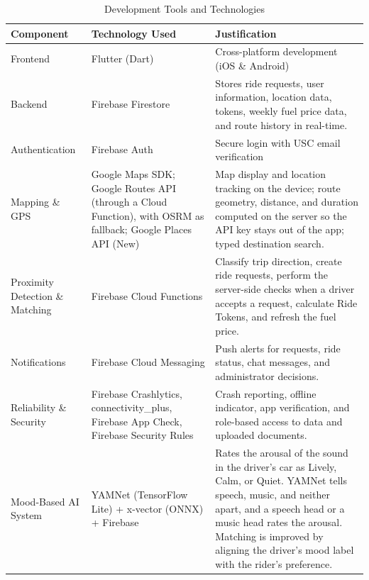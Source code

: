 \begin{table}[htbp]
    \centering
    \caption{Development Tools and Technologies}
    \small
    \renewcommand{\arraystretch}{1.2}

    \begin{tabular}{|>{\raggedright\arraybackslash}p{}|>{\raggedright\arraybackslash}p{}|>{\raggedright\arraybackslash}p{}|}
        \hline
        \textbf{Component} & \textbf{Technology Used} & \textbf{Justification} \\ 
        \hline
        Frontend & Flutter (Dart) & Cross-platform development (iOS \& Android) \\ 
        
        Backend & Firebase Firestore & Stores ride requests, user information, location data, tokens, weekly fuel price data, and route history in real-time. \\ 

        Authentication & Firebase Auth & Secure login with USC email verification \\ 
        
        Mapping \& GPS & Google Maps SDK; Google Routes API (through a Cloud Function), with OSRM as fallback; Google Places API (New) & Map display and location tracking on the device; route geometry, distance, and duration computed on the server so the API key stays out of the app; typed destination search. \\ 
        
        Proximity Detection \& Matching & Firebase Cloud Functions & Classify trip direction, create ride requests, perform the server-side checks when a driver accepts a request, calculate Ride Tokens, and refresh the fuel price. \\ 

        Notifications & Firebase Cloud Messaging & Push alerts for requests, ride status, chat messages, and administrator decisions. \\ 

        Reliability \& Security & Firebase Crashlytics, connectivity\_plus, Firebase App Check, Firebase Security Rules & Crash reporting, offline indicator, app verification, and role-based access to data and uploaded documents. \\ 
        
        Mood-Based AI System & YAMNet (TensorFlow Lite) + x-vector (ONNX) + Firebase & Rates the arousal of the sound in the driver's car as Lively, Calm, or Quiet. YAMNet tells speech, music, and neither apart, and a speech head or a music head rates the arousal. Matching is improved by aligning the driver's mood label with the rider's preference. \\ 
        

\end{tabular}
\end{table}
